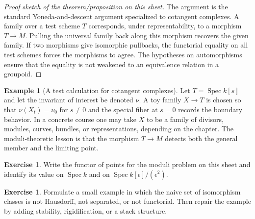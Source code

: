 \documentclass[11pt]{amsart}
\theoremstyle{definition}
\newtheorem{example}[theorem]{Example}
\newtheorem{exercise}[theorem]{Exercise}
\newcommand{\Spec}{\operatorname{Spec}}
\begin{document}
\begin{proof}[Proof sketch of the theorem/proposition on this sheet]
The argument is the standard Yoneda-and-descent argument specialized to cotangent complexes.  A family over a test scheme $T$ corresponds, under representability, to a morphism $T\to M$.  Pulling the universal family back along this morphism recovers the given family.  If two morphisms give isomorphic pullbacks, the functorial equality on all test schemes forces the morphisms to agree.  The hypotheses on automorphisms ensure that the equality is not weakened to an equivalence relation in a groupoid.
\end{proof}
\begin{example}[A test calculation for cotangent complexes]
Let $T=\Spec k[s]$ and let the invariant of interest be denoted $\nu$.  A toy family $X\to T$ is chosen so that $\nu(X_t)=\nu_0$ for $s\ne0$ and the special fiber at $s=0$ records the boundary behavior.  In a concrete course one may take $X$ to be a family of divisors, modules, curves, bundles, or representations, depending on the chapter.  The moduli-theoretic lesson is that the morphism $T\to M$ detects both the general member and the limiting point.
\end{example}
\begin{exercise}
Write the functor of points for the moduli problem on this sheet and identify its value on $\Spec k$ and on $\Spec k[\epsilon]/(\epsilon^2)$.
\end{exercise}
\begin{exercise}
Formulate a small example in which the naive set of isomorphism classes is not Hausdorff, not separated, or not functorial.  Then repair the example by adding stability, rigidification, or a stack structure.
\end{exercise}
\clearpage
\end{document}
